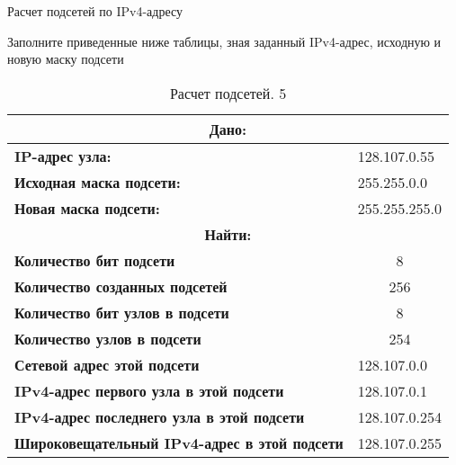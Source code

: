 \documentclass[a4paper,14pt]{extarticle}
\begin{document}
\begin{mypart}{Расчет подсетей по IPv4-адресу}
\begin{step}{Заполните приведенные ниже таблицы, зная заданный IPv4-адрес, исходную и
			новую маску подсети}
\begin{table}[h!]
	\centering
	\caption{Расчет подсетей. 5}
	\begin{tabular}{|l|l|}
		\hline
			\multicolumn{2}{|c|}{\textbf{Дано:}}  \\ \hline
		\textbf{IP-адрес узла:} & 128.107.0.55 \\ \hline
		\textbf{Исходная маска подсети:} & 255.255.0.0 \\ \hline
		\textbf{Новая маска подсети:} & 255.255.255.0 \\ \hline
			\multicolumn{2}{|c|}{\textbf{Найти:}}  \\ \hline
		\textbf{Количество бит подсети} & \multicolumn{1}{c|}{8} \\ \hline
		\textbf{Количество созданных подсетей} & \multicolumn{1}{c|}{256} \\ \hline
		\textbf{Количество бит узлов в подсети} & \multicolumn{1}{c|}{8} \\ \hline
		\textbf{Количество узлов в подсети} & \multicolumn{1}{c|}{254} \\ \hline
		\textbf{Сетевой адрес этой подсети} & 128.107.0.0 \\ \hline
		\textbf{IPv4-адрес первого узла в этой подсети} & 128.107.0.1 \\ \hline
		\textbf{IPv4-адрес последнего узла в этой подсети} & 128.107.0.254 \\ \hline
		\textbf{Широковещательный IPv4-адрес в этой подсети} & 128.107.0.255 \\ \hline
	\end{tabular}
	\label{}
\end{table}


\end{step}
\end{mypart}
\end{document}
